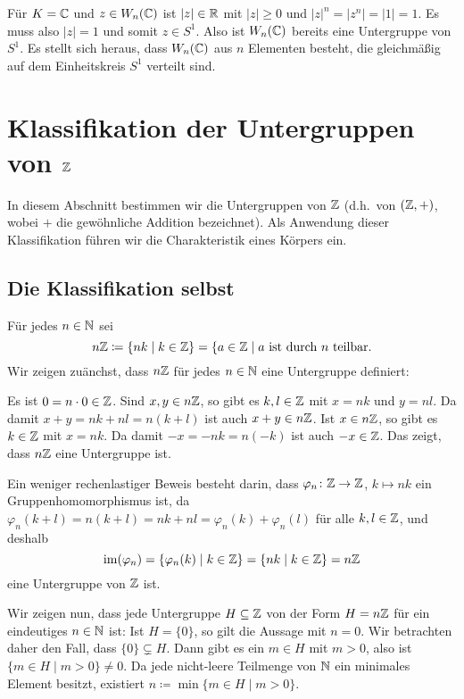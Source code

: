 Für $K = \mathbb{C}$ und $z \in W_n(\mathbb{C})$ ist $|z| \in \mathbb{R}$ mit $|z| \geq 0$ und $|z|^n = |z^n| = |1| = 1$. Es muss also $|z| = 1$ und somit $z \in S^1$. Also ist $W_n(\mathbb{C})$ bereits eine Untergruppe von $S^1$. Es stellt sich heraus, dass $W_n(\mathbb{C})$ aus $n$ Elementen besteht, die gleichmäßig auf dem Einheitskreis $S^1$ verteilt sind.






\section{Klassifikation der Untergruppen von \texorpdfstring{$\mathbb{Z}$}{Z}}
In diesem Abschnitt bestimmen wir die Untergruppen von $\mathbb{Z}$ (d.h.\ von $(\mathbb{Z},+)$, wobei $+$ die gewöhnliche Addition bezeichnet). Als Anwendung dieser Klassifikation führen wir die Charakteristik eines Körpers ein.


\subsection{Die Klassifikation selbst}
Für jedes $n \in \mathbb{N}$ sei
\[
 n \mathbb{Z}
 \coloneqq \{n k \mid k \in \mathbb{Z}\}
 = \{a \in \mathbb{Z} \mid \text{$a$ ist durch $n$ teilbar}.
\]
Wir zeigen zuänchst, dass $n \mathbb{Z}$ für jedes $n \in \mathbb{N}$ eine Untergruppe definiert:

Es ist $0 = n \cdot 0 \in \mathbb{Z}$. Sind $x,y \in n\mathbb{Z}$, so gibt es $k,l \in \mathbb{Z}$ mit $x = nk$ und $y = nl$. Da damit $x+y = nk + nl = n(k+l)$ ist auch $x+y \in n\mathbb{Z}$. Ist $x \in n\mathbb{Z}$, so gibt es $k \in \mathbb{Z}$ mit $x = nk$. Da damit $-x = -nk = n(-k)$ ist auch $-x \in \mathbb{Z}$. Das zeigt, dass $n\mathbb{Z}$ eine Untergruppe ist.

\begin{bem}
 Ein weniger rechenlastiger Beweis besteht darin, dass $\varphi_n \colon \mathbb{Z} \to \mathbb{Z}$, $k \mapsto nk$ ein Gruppenhomomorphismus ist, da $\varphi_n(k+l) = n(k+l) = nk + nl = \varphi_n(k) + \varphi_n(l)$ für alle $k,l \in \mathbb{Z}$, und deshalb
 \[
  \mathrm{im}(\varphi_n) = \{\varphi_n(k) \mid k \in \mathbb{Z}\} = \{nk \mid k \in \mathbb{Z}\} = n\mathbb{Z}
 \]
 eine Untergruppe von $\mathbb{Z}$ ist.
\end{bem}

Wir zeigen nun, dass jede Untergruppe $H \subseteq \mathbb{Z}$ von der Form $H = n\mathbb{Z}$ für ein eindeutiges $n \in \mathbb{N}$ ist: Ist $H = \{0\}$, so gilt die Aussage mit $n = 0$. Wir betrachten daher den Fall, dass $\{0\} \subsetneq H$. Dann gibt es ein $m \in H$ mit $m > 0$, also ist $\{m \in H \mid m > 0\} \neq 0$. Da jede nicht-leere Teilmenge von $\mathbb{N}$ ein minimales Element besitzt, existiert $n \coloneqq \min \{m \in H \mid m > 0\}$.

